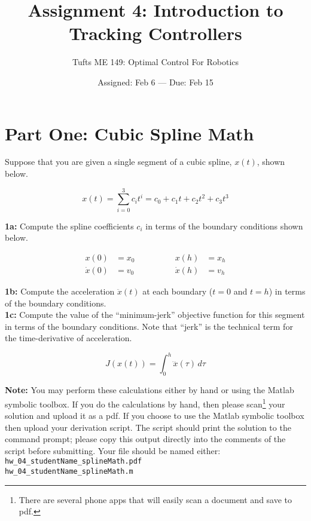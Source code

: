 

\title{Assignment 4:  Introduction to Tracking Controllers}
\date{Assigned:  Feb 6  ---  Due:  Feb 15}
\author{Tufts ME 149:  Optimal Control For Robotics}

\maketitle

\section*{Part One: Cubic Spline Math}

Suppose that you are given a single segment of a cubic spline, $x(t)$, shown below.

\begin{equation}
x(t) = \sum_{i=0}^3 c_i t^i = c_0 + c_1 t + c_2 t^2 + c_3 t ^ 3
\end{equation}

\textbf{1a:} Compute the spline coefficients $c_i$ in terms of the boundary conditions shown below. \\

\vspace{-1em}

\begin{align}
x(0) &= x_0
  \quad \quad & \quad \quad
x(h) &= x_h
  \\
\dot{x}(0) &= v_0
  \quad \quad & \quad \quad
\dot{x}(h) &= v_h
\end{align}

\textbf{1b:} Compute the acceleration $\ddot{x}(t)$ at each boundary ($t=0$ and $t=h$)
in terms of the boundary conditions.\\

\textbf{1c:} Compute the value of the
``minimum-jerk'' objective function for this segment in terms of the boundary conditions.
Note that ``jerk'' is the technical term for the time-derivative of acceleration.

\begin{equation}
  J(x(t)) = \int_0^h \! \dddot{x}(\tau) \, d\tau
\end{equation}

\textbf{Note:}
You may perform these calculations either by hand or using the Matlab symbolic toolbox.
If you do the calculations by hand, then please
scan\footnote{There are several phone apps that will easily scan a document and save to pdf.}
your solution and upload it as a pdf.
If you choose to use the Matlab symbolic toolbox then upload your derivation script.
The script should print the solution to the command prompt;
please copy this output directly into the comments of the script before submitting.
Your file should be named either: \\
\texttt{hw\_04\_studentName\_splineMath.pdf} \\
\texttt{hw\_04\_studentName\_splineMath.m}

